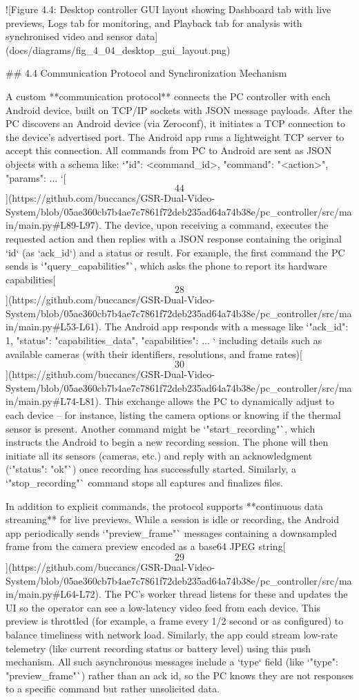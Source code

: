 \documentclass[12pt,a4paper]{article}
\begin{document}
{![Figure 4.4: Desktop controller GUI layout showing Dashboard tab with live previews, Logs tab for monitoring, and Playback tab for analysis with synchronised video and sensor data](docs/diagrams/fig_4_04_desktop_gui_layout.png)

## 4.4 Communication Protocol and Synchronization Mechanism

A custom **communication protocol** connects the PC controller with each
Android device, built on TCP/IP sockets with JSON message payloads.
After the PC discovers an Android device (via Zeroconf), it initiates a
TCP connection to the device's advertised port. The Android app runs a
lightweight TCP server to accept this connection. All commands from PC
to Android are sent as JSON objects with a schema like:
`{"id": <command_id>, "command": "<action>", "params": { ... }}`[\[44\]](https://github.com/buccancs/GSR-Dual-Video-System/blob/05ae360cb7b4ae7c7861f72deb235ad64a74b38e/pc_controller/src/main/main.py#L89-L97).
The device, upon receiving a command, executes the requested action and
then replies with a JSON response containing the original `id` (as
`ack_id`) and a status or result. For example, the first command the PC
sends is `"query_capabilities"`, which asks the phone to report its
hardware
capabilities[\[28\]](https://github.com/buccancs/GSR-Dual-Video-System/blob/05ae360cb7b4ae7c7861f72deb235ad64a74b38e/pc_controller/src/main/main.py#L53-L61).
The Android app responds with a message like
`{"ack_id": 1, "status": "capabilities_data", "capabilities": { ... }}`
including details such as available cameras (with their identifiers,
resolutions, and frame
rates)[\[30\]](https://github.com/buccancs/GSR-Dual-Video-System/blob/05ae360cb7b4ae7c7861f72deb235ad64a74b38e/pc_controller/src/main/main.py#L74-L81).
This exchange allows the PC to dynamically adjust to each device -- for
instance, listing the camera options or knowing if the thermal sensor is
present. Another command might be `"start_recording"`, which instructs
the Android to begin a new recording session. The phone will then
initiate all its sensors (cameras, etc.) and reply with an
acknowledgment (`"status": "ok"`) once recording has successfully
started. Similarly, a `"stop_recording"` command stops all captures and
finalizes files.

In addition to explicit commands, the protocol supports **continuous
data streaming** for live previews. While a session is idle or
recording, the Android app periodically sends `"preview_frame"` messages
containing a downsampled frame from the camera preview encoded as a
base64 JPEG
string[\[29\]](https://github.com/buccancs/GSR-Dual-Video-System/blob/05ae360cb7b4ae7c7861f72deb235ad64a74b38e/pc_controller/src/main/main.py#L64-L72).
The PC's worker thread listens for these and updates the UI so the
operator can see a low-latency video feed from each device. This preview
is throttled (for example, a frame every 1/2 second or as configured) to
balance timeliness with network load. Similarly, the app could stream
low-rate telemetry (like current recording status or battery level)
using this push mechanism. All such asynchronous messages include a
`type` field (like `"type": "preview_frame"`) rather than an ack id, so
the PC knows they are not responses to a specific command but rather
unsolicited data.

}
\end{document}
